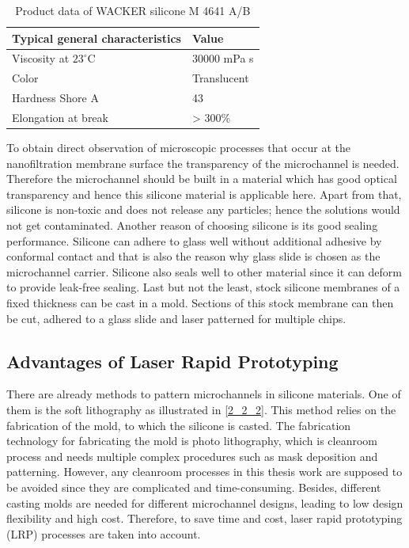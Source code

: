 \begin{table}[!h]
    \centering
    \caption{Product data of WACKER silicone M 4641 A/B \cite{wackersilicone}}
    \begin{tabular}{ll}
    \toprule
    Typical general characteristics	& Value \\
    \midrule
    Viscosity at ${23}^{\circ}$C & 30000 mPa s \\
    Color & Translucent \\
    Hardness Shore A & 43 \\
    Elongation at break & > 300\% \\
    \bottomrule
    \end{tabular}
    \label{table3_1}
\end{table}

To obtain direct observation of microscopic processes that occur at the nanofiltration membrane surface the transparency of the microchannel is needed. Therefore the microchannel should be built in a material which has good optical transparency and hence this silicone material is applicable here. Apart from that, silicone is non-toxic and does not release any particles; hence the solutions would not get contaminated. Another reason of choosing silicone is its good sealing performance. Silicone can adhere to glass well without additional adhesive by conformal contact and that is also the reason why glass slide is chosen as the microchannel carrier. Silicone also seals well to other material since it can deform to provide leak-free sealing. Last but not the least, stock silicone membranes of a fixed thickness can be cast in a mold. Sections of this stock membrane can then be cut, adhered to a glass slide and laser patterned for multiple chips. \\

\subsection{Advantages of Laser Rapid Prototyping}
\label{3_2_2}
There are already methods to pattern microchannels in silicone materials. One of them is the soft lithography as illustrated in \autoref{2_2_2}. This method relies on the fabrication of the mold, to which the silicone is casted. The fabrication technology for fabricating the mold is photo lithography, which is cleanroom process and needs multiple complex procedures such as mask deposition and patterning. However, any cleanroom processes in this thesis work are supposed to be avoided since they are complicated and time-consuming. Besides, different casting molds are needed for different microchannel designs, leading to low design flexibility and high cost. Therefore, to save time and cost, laser rapid prototyping (LRP) processes are taken into account.\\

